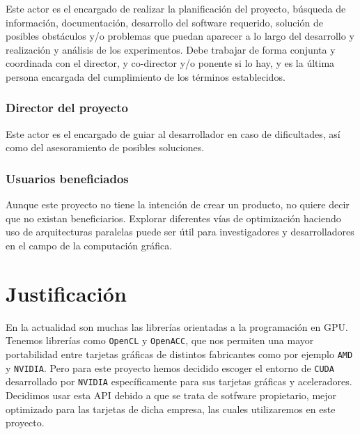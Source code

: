 \documentclass[titlepage,12pt]{report}
\begin{document}
Este actor es el encargado de realizar la planificación del proyecto, búsqueda de información, documentación, desarrollo del software requerido, solución de posibles obstáculos y/o problemas que puedan aparecer a lo largo del desarrollo y realización y análisis de los experimentos. Debe trabajar de forma conjunta y coordinada con el director, y co-director y/o ponente si lo hay, y es la última persona encargada del cumplimiento de los términos establecidos.

\subsubsection{Director del proyecto}

Este actor es el encargado de guiar al desarrollador en caso de dificultades, así como del asesoramiento de posibles soluciones.

\subsubsection{Usuarios beneficiados}

Aunque este proyecto no tiene la intención de crear un producto, no quiere decir que no existan beneficiarios. Explorar diferentes vías de optimización haciendo uso de arquitecturas paralelas puede ser útil para investigadores y desarrolladores en el campo de la computación gráfica.

\section{Justificación}

En la actualidad son muchas las librerías orientadas a la programación en GPU. Tenemos librerías como \texttt{OpenCL} y \texttt{OpenACC}, que nos permiten una mayor portabilidad entre tarjetas gráficas de distintos fabricantes como por ejemplo \texttt{AMD} y \texttt{NVIDIA}. Pero para este proyecto hemos decidido escoger el entorno de \texttt{CUDA} desarrollado por \texttt{NVIDIA} específicamente para sus tarjetas gráficas y aceleradores. Decidimos usar esta API debido a que se trata de sotfware propietario, mejor optimizado para las tarjetas de dicha empresa, las cuales utilizaremos en este proyecto.
\end{document}
